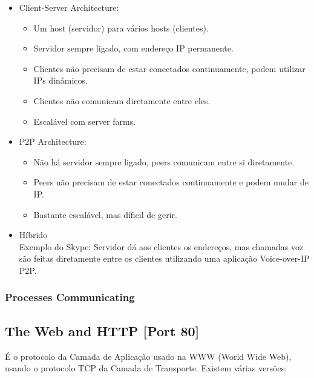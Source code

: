 \documentclass[12pt]{article}
\begin{document}
\begin{itemize}
    \item Client-Server Architecture:
        \begin{itemize}[topsep=0pt]
            \item Um host (servidor) para vários hosts (clientes).
            \item Servidor sempre ligado, com endereço IP permanente.
            \item Clientes não precisam de estar conectados continuamente, podem utilizar IPs dinâmicos.
            \item Clientes não comunicam diretamente entre eles.
            \item Escalável com server farms.
        \end{itemize}
    \item P2P Architecture:
        \begin{itemize}[topsep=0pt]
            \item Não há servidor sempre ligado, peers comunicam entre si diretamente.
            \item Peers não precisam de estar conectados continuamente e podem mudar de IP.
            \item Bastante escalável, mas díficil de gerir.
        \end{itemize}
    \item Híbrido \\
        Exemplo do Skype: Servidor dá aos clientes os endereços, mas chamadas voz são feitas diretamente entre os clientes utilizando uma aplicação Voice-over-IP P2P.
\end{itemize}

\subsubsection{Processes Communicating}

\subsection{The Web and HTTP [Port 80]}

É o protocolo da Camada de Aplicação usado na WWW (World Wide Web), usando o protocolo TCP da Camada de Transporte. Existem várias versões:
\end{document}
